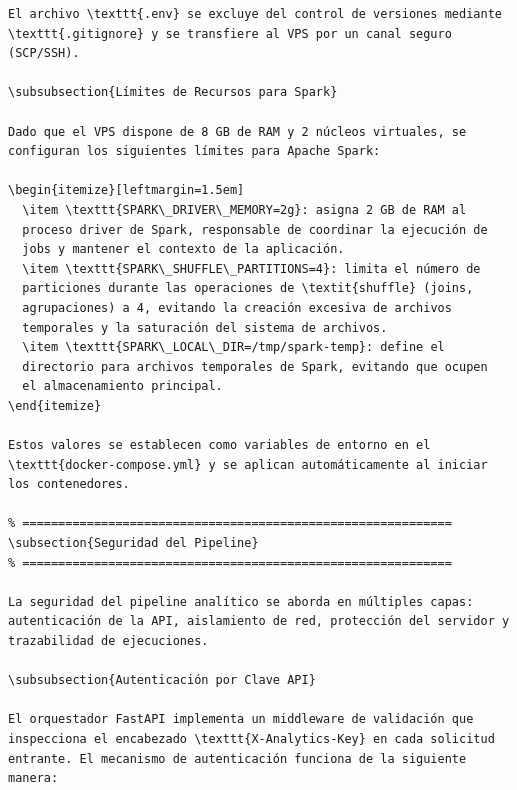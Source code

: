 \begin{verbatim}
El archivo \texttt{.env} se excluye del control de versiones mediante
\texttt{.gitignore} y se transfiere al VPS por un canal seguro
(SCP/SSH).

\subsubsection{Límites de Recursos para Spark}

Dado que el VPS dispone de 8 GB de RAM y 2 núcleos virtuales, se
configuran los siguientes límites para Apache Spark:

\begin{itemize}[leftmargin=1.5em]
  \item \texttt{SPARK\_DRIVER\_MEMORY=2g}: asigna 2 GB de RAM al
  proceso driver de Spark, responsable de coordinar la ejecución de
  jobs y mantener el contexto de la aplicación.
  \item \texttt{SPARK\_SHUFFLE\_PARTITIONS=4}: limita el número de
  particiones durante las operaciones de \textit{shuffle} (joins,
  agrupaciones) a 4, evitando la creación excesiva de archivos
  temporales y la saturación del sistema de archivos.
  \item \texttt{SPARK\_LOCAL\_DIR=/tmp/spark-temp}: define el
  directorio para archivos temporales de Spark, evitando que ocupen
  el almacenamiento principal.
\end{itemize}

Estos valores se establecen como variables de entorno en el
\texttt{docker-compose.yml} y se aplican automáticamente al iniciar
los contenedores.

% ============================================================
\subsection{Seguridad del Pipeline}
% ============================================================

La seguridad del pipeline analítico se aborda en múltiples capas:
autenticación de la API, aislamiento de red, protección del servidor y
trazabilidad de ejecuciones.

\subsubsection{Autenticación por Clave API}

El orquestador FastAPI implementa un middleware de validación que
inspecciona el encabezado \texttt{X-Analytics-Key} en cada solicitud
entrante. El mecanismo de autenticación funciona de la siguiente manera:


\end{verbatim}
